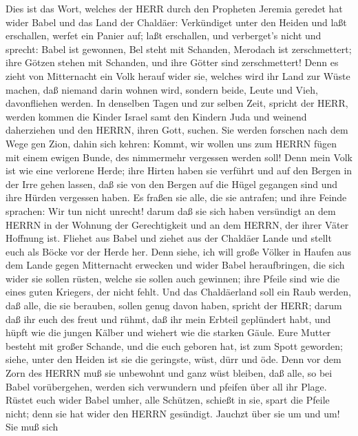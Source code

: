  Dies ist das Wort, welches der HERR durch den Propheten
Jeremia geredet hat wider Babel und das Land der Chaldäer: 
Verkündiget unter den Heiden und laßt erschallen, werfet ein Panier auf;
laßt erschallen, und verberget's nicht und sprecht: Babel ist gewonnen,
Bel steht mit Schanden, Merodach ist zerschmettert; ihre Götzen stehen
mit Schanden, und ihre Götter sind zerschmettert!  Denn es
zieht von Mitternacht ein Volk herauf wider sie, welches wird ihr Land
zur Wüste machen, daß niemand darin wohnen wird, sondern beide, Leute
und Vieh, davonfliehen werden.  In denselben Tagen und zur
selben Zeit, spricht der HERR, werden kommen die Kinder Israel samt den
Kindern Juda und weinend daherziehen und den HERRN, ihren Gott, suchen.
 Sie werden forschen nach dem Wege gen Zion, dahin sich
kehren: Kommt, wir wollen uns zum HERRN fügen mit einem ewigen Bunde,
des nimmermehr vergessen werden soll!  Denn mein Volk ist
wie eine verlorene Herde; ihre Hirten haben sie verführt und auf den
Bergen in der Irre gehen lassen, daß sie von den Bergen auf die Hügel
gegangen sind und ihre Hürden vergessen haben.  Es fraßen
sie alle, die sie antrafen; und ihre Feinde sprachen: Wir tun nicht
unrecht! darum daß sie sich haben versündigt an dem HERRN in der Wohnung
der Gerechtigkeit und an dem HERRN, der ihrer Väter Hoffnung ist.
 Fliehet aus Babel und ziehet aus der Chaldäer Lande und
stellt euch als Böcke vor der Herde her.  Denn siehe, ich
will große Völker in Haufen aus dem Lande gegen Mitternacht erwecken und
wider Babel heraufbringen, die sich wider sie sollen rüsten, welche sie
sollen auch gewinnen; ihre Pfeile sind wie die eines guten Kriegers, der
nicht fehlt.  Und das Chaldäerland soll ein Raub werden,
daß alle, die sie berauben, sollen genug davon haben, spricht der HERR;
 darum daß ihr euch des freut und rühmt, daß ihr mein
Erbteil geplündert habt, und hüpft wie die jungen Kälber und wiehert wie
die starken Gäule.  Eure Mutter besteht mit großer Schande,
und die euch geboren hat, ist zum Spott geworden; siehe, unter den
Heiden ist sie die geringste, wüst, dürr und öde.  Denn vor
dem Zorn des HERRN muß sie unbewohnt und ganz wüst bleiben, daß alle, so
bei Babel vorübergehen, werden sich verwundern und pfeifen über all ihr
Plage.  Rüstet euch wider Babel umher, alle Schützen,
schießt in sie, spart die Pfeile nicht; denn sie hat wider den HERRN
gesündigt.  Jauchzt über sie um und um! Sie muß sich
